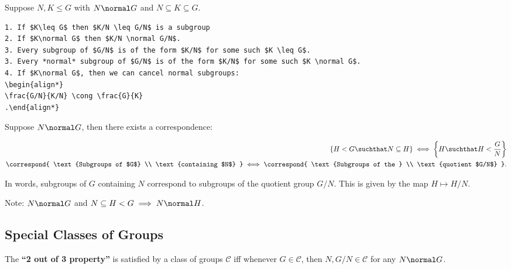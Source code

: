 \begin{theorem}

Suppose \(N, K \leq G\) with \(N \normal G\) and
\(N\subseteq K \subseteq G\).

\begin{verbatim}
1. If $K\leq G$ then $K/N \leq G/N$ is a subgroup
2. If $K\normal G$ then $K/N \normal G/N$.
3. Every subgroup of $G/N$ is of the form $K/N$ for some such $K \leq G$.
3. Every *normal* subgroup of $G/N$ is of the form $K/N$ for some such $K \normal G$.
4. If $K\normal G$, then we can cancel normal subgroups:
\begin{align*}
\frac{G/N}{K/N} \cong \frac{G}{K}
.\end{align*}
\end{verbatim}

\end{theorem}

\begin{theorem}

Suppose \(N \normal G\), then there exists a correspondence:

\begin{align*}
\left\{
H < G \suchthat N \subseteq H
\right\}
\iff
\left\{
H \suchthat H < \frac G N
\right\}
\\
\correspond{
  \text{Subgroups of $G$} \\
  \text{containing $N$}
} \iff
\correspond{
  \text{Subgroups of the } \\
  \text{quotient $G/N$}
}
.\end{align*}

In words, subgroups of \(G\) containing \(N\) correspond to subgroups of
the quotient group \(G/N\). This is given by the map \(H \mapsto H/N\).

\end{theorem}

Note: \(N \normal G\) and \(N \subseteq H < G \implies N \normal H\).

\hypertarget{special-classes-of-groups}{%
\subsection{Special Classes of Groups}\label{special-classes-of-groups}}

\begin{definition}

The \textbf{``2 out of 3 property''} is satisfied by a class of groups
\(\mathcal C\) iff whenever \(G \in \mathcal C\), then
\(N, G/N \in \mathcal{C}\) for any \(N \normal G\).

\end{definition}

